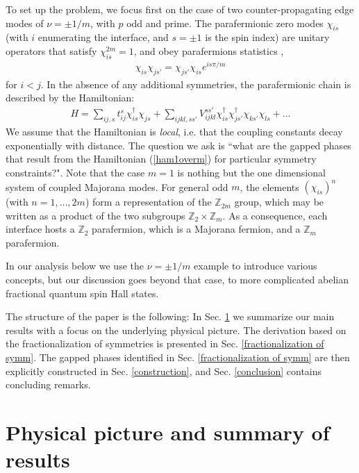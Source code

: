 \documentclass[twocolumn,aps,prb,showpacs]{revtex4-1}
\begin{document}
To set up the problem, we focus first on the case of two counter-propagating edge modes of $\nu=\pm 1/m$, with $p$ odd and prime. The parafermionic zero modes $\chi_{is}$ (with $i$ enumerating the interface, and $s=\pm 1$ is the spin index) are unitary operators that satisfy $\chi_{is}^{2m}=1$, and obey parafermions statistics \cite{Fradkin1980,Fendley2012},
\begin{align}
\chi_{is}\chi_{js'}=
\chi_{js'}\chi_{is}  e^{is \pi/m}
\label{zeromodes1overm}
\end{align}
for $ i<j$.
In the absence of any additional symmetries, the parafermionic chain is described by the Hamiltonian:
\begin{align}
H= \sum_{ij,s} t_{ij}^s\chi_{is}^\dag\chi_{js}+ \sum_{ijkl,ss'} V_{ijkl}^{ss'}\chi_{is}^\dag\chi_{js'}^\dag\chi_{ks'}\chi_{ls}+...
\label{ham1overm}
\end{align}
We assume that the Hamiltonian is \emph{local}, i.e. that the coupling constants decay exponentially with distance. 
The question we ask is ``what are the gapped phases that result from the Hamiltonian (\ref{ham1overm}) for particular symmetry constraints?". Note that the case $m=1$ is nothing but the one dimensional system of coupled Majorana modes. For general odd $m$, the elements $(\chi_{is})^n$ (with $n= 1, \dots, 2m$) form a representation of the $\mathbb{Z}_{2m}$ group, which may be written as a product of the two subgroups $\mathbb{Z}_2\times \mathbb{Z}_m$. As a consequence, each interface hosts a $\mathbb{Z}_2$ parafermion, which is a Majorana fermion, and a $\mathbb{Z}_m$ parafermion.

In our analysis below we use the $\nu=\pm 1/m$ example to introduce various concepts, but our discussion goes beyond that case, to more complicated abelian fractional quantum spin Hall states.


The structure of the paper is the following: In Sec. \ref{results} we summarize our main results with a focus on the underlying physical picture. The derivation based on the fractionalization of symmetries  is presented in Sec. \ref{fractionalization of symm}. The gapped phases identified  in Sec. \ref{fractionalization of symm} are then explicitly constructed in Sec. \ref{construction}, and  Sec. \ref{conclusion} contains concluding remarks.

\section{Physical picture and summary of results}\label{results}
\end{document}
